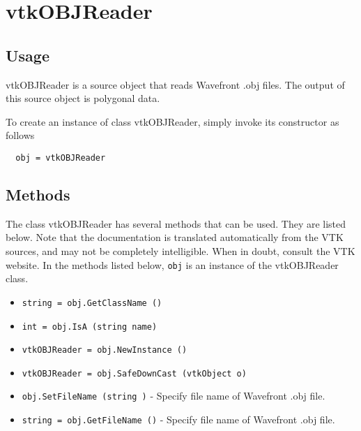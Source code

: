 \section{vtkOBJReader}

\subsection{Usage}

 vtkOBJReader is a source object that reads Wavefront .obj
 files. The output of this source object is polygonal data.

To create an instance of class vtkOBJReader, simply
invoke its constructor as follows
\begin{verbatim}
  obj = vtkOBJReader
\end{verbatim}
\subsection{Methods}

The class vtkOBJReader has several methods that can be used.
  They are listed below.
Note that the documentation is translated automatically from the VTK sources,
and may not be completely intelligible.  When in doubt, consult the VTK website.
In the methods listed below, \verb|obj| is an instance of the vtkOBJReader class.
\begin{itemize}
\item  \verb|string = obj.GetClassName ()|

\item  \verb|int = obj.IsA (string name)|

\item  \verb|vtkOBJReader = obj.NewInstance ()|

\item  \verb|vtkOBJReader = obj.SafeDownCast (vtkObject o)|

\item  \verb|obj.SetFileName (string )| -  Specify file name of Wavefront .obj file.

\item  \verb|string = obj.GetFileName ()| -  Specify file name of Wavefront .obj file.

\end{itemize}
